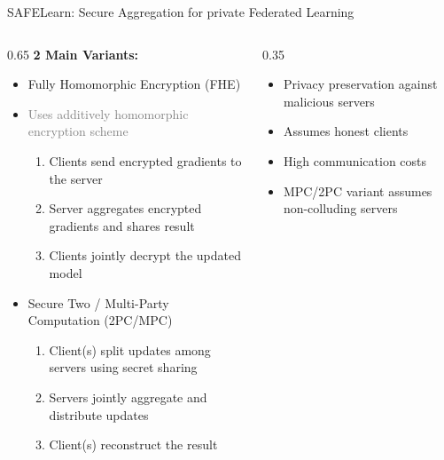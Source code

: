\documentclass[t,aspectratio=169]{beamer}
\begin{document}
\begin{frame}{SAFELearn: Secure Aggregation for private Federated Learning \cite{cryptoeprint:2021/386}}
    \begin{columns}
        \begin{column}{0.65\textwidth}
            \textbf{2 Main Variants:}\\
            \begin{itemize}
                \item Fully Homomorphic Encryption (FHE)
                \item [] \textcolor{gray}{Uses additively homomorphic encryption scheme}
                \begin{enumerate}
                    \item Clients send encrypted gradients to the server
                    \item Server aggregates encrypted gradients and shares result
                    \item Clients jointly decrypt the updated model
                \end{enumerate}
                \pause
                \item Secure Two / Multi-Party Computation (2PC/MPC)
                \begin{enumerate}
                    \item Client(s) split updates among servers using secret sharing
                    \item Servers jointly aggregate and distribute updates
                    \item Client(s) reconstruct the result
                \end{enumerate}
            \end{itemize}
        \end{column}
        \begin{column}{0.35\textwidth}
            \pause
            \begin{itemize}
                \item[\textcolor{green}{+}] Privacy preservation against malicious servers
                \item[\textcolor{red}{!}] Assumes honest clients
                \item[] High communication costs
                \item[] MPC/2PC variant assumes non-colluding servers
            \end{itemize}
        \end{column}
    \end{columns}
\end{frame}
\end{document}
